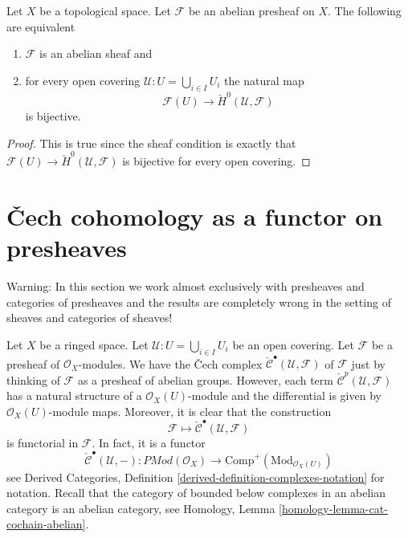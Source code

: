 \begin{lemma}
\label{lemma-cech-h0}
Let $X$ be a topological space.
Let $\mathcal{F}$ be an abelian presheaf on $X$.
The following are equivalent
\begin{enumerate}
\item $\mathcal{F}$ is an abelian sheaf and
\item for every open covering $\mathcal{U} : U = \bigcup_{i \in I} U_i$
the natural map
$$
\mathcal{F}(U) \to \check{H}^0(\mathcal{U}, \mathcal{F})
$$
is bijective.
\end{enumerate}
\end{lemma}

\begin{proof}
This is true since the sheaf condition is exactly that
$\mathcal{F}(U) \to \check{H}^0(\mathcal{U}, \mathcal{F})$
is bijective for every open covering.
\end{proof}






\section{{\v C}ech cohomology as a functor on presheaves}
\label{section-cech-functor}

\noindent
Warning: In this section we work almost exclusively with presheaves and
categories of presheaves and the results are completely wrong in the
setting of sheaves and categories of sheaves!

\medskip\noindent
Let $X$ be a ringed space.
Let $\mathcal{U} : U = \bigcup_{i \in I} U_i$ be an open covering.
Let $\mathcal{F}$ be a presheaf of $\mathcal{O}_X$-modules.
We have the {\v C}ech complex
$\check{\mathcal{C}}^\bullet(\mathcal{U}, \mathcal{F})$
of $\mathcal{F}$ just by thinking of $\mathcal{F}$
as a presheaf of abelian groups. However, each term
$\check{\mathcal{C}}^p(\mathcal{U}, \mathcal{F})$ has a natural
structure of a $\mathcal{O}_X(U)$-module and the differential is given by
$\mathcal{O}_X(U)$-module maps. Moreover, it is clear that the
construction
$$
\mathcal{F} \longmapsto \check{\mathcal{C}}^\bullet(\mathcal{U}, \mathcal{F})
$$
is functorial in $\mathcal{F}$. In fact, it is a functor
\begin{equation}
\label{equation-cech-functor}
\check{\mathcal{C}}^\bullet(\mathcal{U}, -) :
\textit{PMod}(\mathcal{O}_X)
\longrightarrow
\text{Comp}^{+}(\text{Mod}_{\mathcal{O}_X(U)})
\end{equation}
see
Derived Categories, Definition \ref{derived-definition-complexes-notation}
for notation. Recall that the category of bounded below complexes
in an abelian category is an abelian category, see
Homology, Lemma \ref{homology-lemma-cat-cochain-abelian}.


